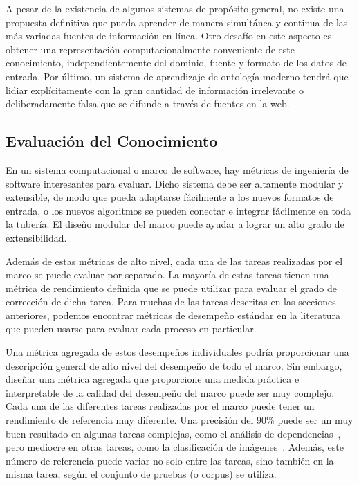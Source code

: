 A pesar de la existencia de algunos sistemas de propósito general, no existe una propuesta definitiva que pueda aprender de manera simultánea y continua de las más variadas fuentes de información en línea.
Otro desafío en este aspecto es obtener una representación computacionalmente conveniente de este conocimiento, independientemente del dominio, fuente y formato de los datos de entrada.
Por último, un sistema de aprendizaje de ontología moderno tendrá que lidiar explícitamente con la gran cantidad de información irrelevante o deliberadamente falsa que se difunde a través de fuentes en la web.

\subsection{Evaluación del Conocimiento}\label{sec: evaluación}

En un sistema computacional o marco de software, hay métricas de ingeniería de software interesantes para evaluar.
Dicho sistema debe ser altamente modular y extensible, de modo que pueda adaptarse fácilmente a los nuevos formatos de entrada, o los nuevos algoritmos se pueden conectar e integrar fácilmente en toda la tubería.
El diseño modular del marco puede ayudar a lograr un alto grado de extensibilidad.

Además de estas métricas de alto nivel, cada una de las tareas realizadas por el marco se puede evaluar por separado.
La mayoría de estas tareas tienen una métrica de rendimiento definida que se puede utilizar para evaluar el grado de corrección de dicha tarea.
Para muchas de las tareas descritas en las secciones anteriores, podemos encontrar métricas de desempeño estándar en la literatura que pueden usarse para evaluar cada proceso en particular.

Una métrica agregada de estos desempeños individuales podría proporcionar una descripción general de alto nivel del desempeño de todo el marco.
Sin embargo, diseñar una métrica agregada que proporcione una medida práctica e interpretable de la calidad del desempeño del marco puede ser muy complejo.
Cada una de las diferentes tareas realizadas por el marco puede tener un rendimiento de referencia muy diferente.
Una precisión del 90\% puede ser un muy buen resultado en algunas tareas complejas, como el análisis de dependencias~\cite{AlbertiABCGKKMO17}, pero mediocre en otras tareas, como la clasificación de imágenes~\cite{Russakovsky2015}.
Además, este número de referencia puede variar no solo entre las tareas, sino también en la misma tarea, según el conjunto de pruebas (o corpus)
se utiliza.

